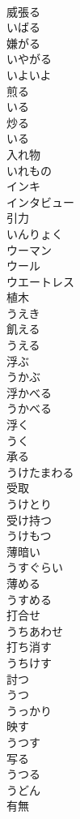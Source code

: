 \documentclass[8pt]{extreport}
\begin{document}
\begin{CJK}{UTF8}{min}
\\	威張る 
\\	いばる	
\\	嫌がる 
\\	いやがる	
\\	いよいよ	
\\	煎る 
\\	いる	
\\	炒る 
\\	いる	
\\	入れ物 
\\	いれもの	
\\	インキ	
\\	インタビュー	
\\	引力 
\\	いんりょく	
\\	ウーマン	
\\	ウール	
\\	ウエートレス	
\\	植木 
\\	うえき	
\\	飢える 
\\	うえる	
\\	浮ぶ 
\\	うかぶ	
\\	浮かべる 
\\	うかべる	
\\	浮く 
\\	うく	
\\	承る 
\\	うけたまわる	
\\	受取 
\\	うけとり	
\\	受け持つ 
\\	うけもつ	
\\	薄暗い 
\\	うすぐらい	
\\	薄める 
\\	うすめる	
\\	打合せ 
\\	うちあわせ	
\\	打ち消す 
\\	うちけす	
\\	討つ 
\\	うつ	
\\	うっかり	
\\	映す 
\\	うつす	
\\	写る 
\\	うつる	
\\	うどん	
\\	有無 

\end{CJK}
\end{document}
